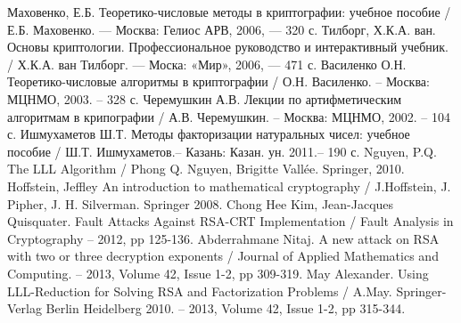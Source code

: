 
\newpage
{}
\begin{thebibliography}{}	
	  Маховенко, Е.Б. Теоретико-числовые методы в криптографии: учебное пособие / Е.Б. Маховенко. — Москва: Гелиос АРВ, 2006, — 320 с.
	  Тилборг, Х.К.А. ван. Основы криптологии. Профессиональное руководство и интерактивный учебник. / Х.К.А. ван Тилборг. — Моска: «Мир», 2006,
	  — 471 с.
	  Василенко О.Н. Теоретико-числовые алгоритмы в криптографии / О.Н. Василенко. – Москва: МЦНМО, 2003. – 328 с.
	  Черемушкин А.В. Лекции по артифметическим алгоритмам в крипографии / А.В. Черемушкин. – Москва: МЦНМО, 2002. – 104 с.
	  Ишмухаметов Ш.Т. Методы факторизации натуральных чисел: учебное пособие / Ш.Т. Ишмухаметов.– Казань: Казан. ун. 2011.– 190 с.
	  Nguyen, P.Q. The LLL Algorithm / Phong Q. Nguyen, Brigitte Vallée. Springer, 2010.
	  Hoffstein, Jeffley An introduction to mathematical cryptography / J.Hoffstein, J. Pipher, J. H. Silverman. Springer 2008.
	  Chong Hee Kim, Jean-Jacques Quisquater. Fault Attacks Against RSA-CRT Implementation / Fault Analysis in Cryptography – 2012, pp 125-136.
	  Abderrahmane Nitaj. A new attack on RSA with two or three decryption exponents / Journal of Applied Mathematics and Computing. –
	  2013, Volume 42, Issue 1-2, pp 309-319.	
	  May Alexander. Using LLL-Reduction for Solving RSA and Factorization Problems / A.May. Springer-Verlag Berlin Heidelberg 2010. –
	  2013, Volume 42, Issue 1-2, pp 315-344.	
\end{thebibliography}